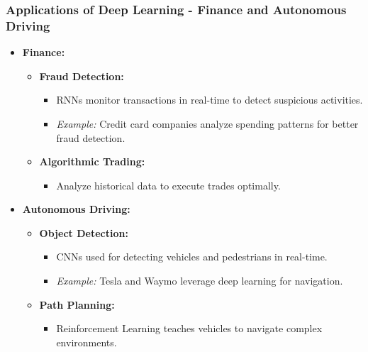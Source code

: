 \documentclass[aspectratio=169]{beamer}
\begin{document}
\begin{frame}[fragile]
    \frametitle{Applications of Deep Learning - Finance and Autonomous Driving}
    \begin{itemize}
        \item \textbf{Finance:} 
        \begin{itemize}
            \item \textbf{Fraud Detection:} 
            \begin{itemize}
                \item RNNs monitor transactions in real-time to detect suspicious activities.
                \item \textit{Example:} Credit card companies analyze spending patterns for better fraud detection.
            \end{itemize}

            \item \textbf{Algorithmic Trading:}
            \begin{itemize}
                \item Analyze historical data to execute trades optimally.
            \end{itemize}
        \end{itemize}
        
        \item \textbf{Autonomous Driving:} 
        \begin{itemize}
            \item \textbf{Object Detection:} 
            \begin{itemize}
                \item CNNs used for detecting vehicles and pedestrians in real-time.
                \item \textit{Example:} Tesla and Waymo leverage deep learning for navigation.
            \end{itemize}

            \item \textbf{Path Planning:}
            \begin{itemize}
                \item Reinforcement Learning teaches vehicles to navigate complex environments.
            \end{itemize}
        \end{itemize}
    \end{itemize}
\end{frame}
\end{document}
